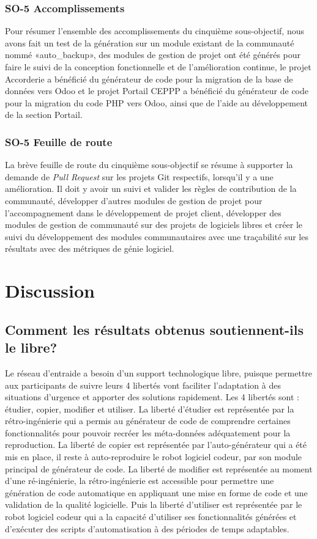 \subsubsection{SO-5 Accomplissements}
Pour résumer l'ensemble des accomplissements du cinquième sous-objectif, nous avons fait un test de la génération sur un module existant de la communauté nommé «auto\_backup», des modules de gestion de projet ont été générés pour faire le suivi de la conception fonctionnelle et de l’amélioration continue, le projet Accorderie a bénéficié du générateur de code pour la migration de la base de données vers Odoo et le projet Portail CEPPP a bénéficié du générateur de code pour la migration du code PHP vers Odoo, ainsi que de l’aide au développement de la section Portail.

\subsubsection{SO-5 Feuille de route}
La brève feuille de route du cinquième sous-objectif se résume à supporter la demande de \textit{\textit{Pull Request}} sur les projets Git respectifs, lorsqu’il y a une amélioration. Il doit y avoir un suivi et valider les règles de contribution de la communauté, développer d’autres modules de gestion de projet pour l’accompagnement dans le développement de projet client, développer des modules de gestion de communauté sur des projets de logiciels libres et créer le suivi du développement des modules communautaires avec une traçabilité sur les résultats avec des métriques de génie logiciel.

\section{Discussion}

\subsection{Comment les résultats obtenus soutiennent-ils le libre?}
Le réseau d’entraide a besoin d’un support technologique libre, puisque permettre aux participants de suivre leurs 4 libertés vont faciliter l'adaptation à des situations d’urgence et apporter des solutions rapidement. Les 4 libertés sont : étudier, copier, modifier et utiliser. La liberté d'étudier est représentée par la rétro-ingénierie qui a permis au générateur de code de comprendre certaines fonctionnalités pour pouvoir recréer les méta-données adéquatement pour la reproduction. La liberté de copier est représentée par l’auto-générateur qui a été mis en place, il reste à auto-reproduire le robot logiciel codeur, par son module principal de générateur de code. La liberté de modifier est représentée au moment d'une ré-ingénierie, la rétro-ingénierie est accessible pour permettre une génération de code automatique en appliquant une mise en forme de code et une validation de la qualité logicielle. Puis la liberté d'utiliser est représentée par le robot logiciel codeur qui a la capacité d’utiliser ses fonctionnalités générées et d’exécuter des scripts d’automatisation à des périodes de temps adaptables.

